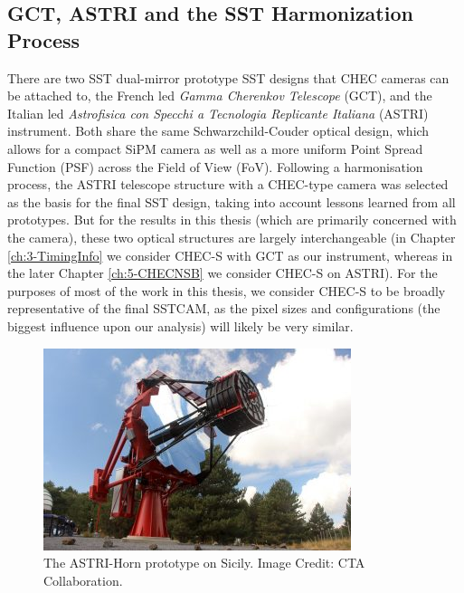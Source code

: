 \subsection{GCT, ASTRI and the SST Harmonization Process}

There are two SST dual-mirror prototype SST designs that CHEC cameras can be attached to, the French led \textit{Gamma Cherenkov Telescope} (GCT), and the Italian led \textit{Astrofisica con Specchi a Tecnologia Replicante Italiana} (ASTRI) instrument. Both share the same Schwarzchild-Couder optical design, which allows for a compact SiPM camera as well as a more uniform Point Spread Function (PSF) across the Field of View (FoV). Following a harmonisation process, the ASTRI telescope structure with a CHEC-type camera was selected as the basis for the final SST design, taking into account lessons learned from all prototypes. But for the results in this thesis (which are primarily concerned with the camera), these two optical structures are largely interchangeable (in Chapter \ref{ch:3-TimingInfo} we consider CHEC-S with GCT as our instrument, whereas in the later Chapter \ref{ch:5-CHECNSB} we consider CHEC-S on ASTRI). For the purposes of most of the work in this thesis, we consider CHEC-S to be broadly representative of the final SSTCAM, as the pixel sizes and configurations (the biggest influence upon our analysis) will likely be very similar.

\begin{figure}[ht] 
        \centering \includegraphics[width=\columnwidth]{figures/astri-horn.jpg}
        \caption{
                \label{fig:astri} %
                The ASTRI-Horn prototype on Sicily. Image Credit: CTA Collaboration.
        }
\end{figure}

